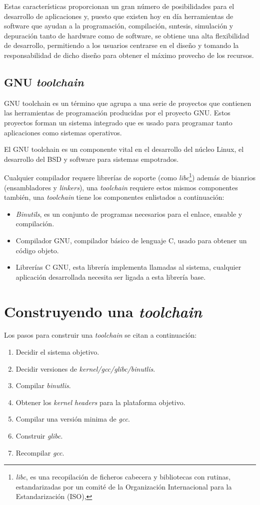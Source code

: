 Estas características proporcionan un gran número de posibilidades para
el desarrollo de aplicaciones y, puesto que existen hoy en día herramientas de
software que ayudan a la programación, compilación, sıntesis, simulación y
depuración tanto de hardware como de software, se obtiene una alta flexibilidad
de desarrollo, permitiendo a los usuarios centrarse en el diseño y tomando la
responsabilidad de dicho diseño para obtener el máximo provecho de los
recursos\cite{alvarado}.



\subsection{GNU \emph{toolchain}}

GNU toolchain es un término que agrupa a una serie de proyectos que contienen
las herramientas de programación producidas por el proyecto GNU. Estos proyectos
forman un sistema integrado que es usado para programar tanto aplicaciones como
sistemas operativos.

El GNU toolchain es un componente vital en el desarrollo del núcleo Linux, el
desarrollo del BSD y software para sistemas empotrados.

Cualquier compilador requere librerías de soporte (como
\emph{libc}\footnote{\emph{libc}, es una recopilación de ficheros cabecera y
bibliotecas con rutinas, estandarizadas por un comité de la Organización
Internacional para la Estandarización (ISO), }) además de bianrios
(ensambladores y \emph{linkers}), una \emph{toolchain} requiere estos mismos
componentes también, una \emph{toolchain} tiene los componentes enlistados a
continuación:
\begin{itemize}
 \item \emph{Binutils}, es un conjunto de programas necesarios para el enlace,
 ensable y compilación.
 \item Compilador GNU, compilador básico de lenguaje C, usado para obtener un
código objeto.
 \item Librerías C GNU, esta librería implementa llamadas al sistema, cualquier
aplicación desarrollada necesita ser ligada a esta librería base.
\end{itemize}

\section{Construyendo una \emph{toolchain}}

Los pasos para construir una \emph{toolchain} se citan a continuación:
\begin{enumerate}
 \item Decidir el sistema objetivo.
 \item Decidir versiones de \emph{kernel/gcc/glibc/binutlis}.
 \item Compilar \emph{binutlis}.
 \item Obtener los \emph{kernel headers} para la plataforma objetivo.
 \item Compilar una versión minima de \emph{gcc}.
 \item Construir \emph{glibc}.
 \item Recompilar \emph{gcc}.
\end{enumerate}

